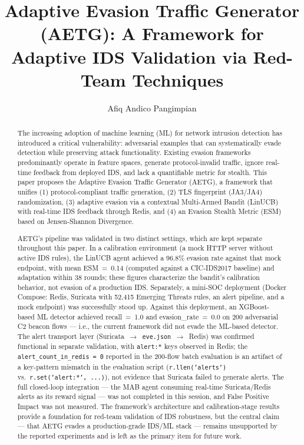 \documentclass[review]{elsarticle}
\begin{document}
\begin{frontmatter}

\title{Adaptive Evasion Traffic Generator (AETG): A Framework for Adaptive IDS Validation via Red-Team Techniques}

\author{Afiq Andico Pangimpian}

\address{Institut Teknologi dan Bisnis STIKOM Bali, Indonesia}

\begin{abstract}
The increasing adoption of machine learning (ML) for network intrusion detection has introduced a critical vulnerability: adversarial examples that can systematically evade detection while preserving attack functionality. Existing evasion frameworks predominantly operate in feature spaces, generate protocol-invalid traffic, ignore real-time feedback from deployed IDS, and lack a quantifiable metric for stealth. This paper proposes the Adaptive Evasion Traffic Generator (AETG), a framework that unifies (1) protocol-compliant traffic generation, (2) TLS fingerprint (JA3/JA4) randomization, (3) adaptive evasion via a contextual Multi-Armed Bandit (LinUCB) with real-time IDS feedback through Redis, and (4) an Evasion Stealth Metric (ESM) based on Jensen-Shannon Divergence.

AETG's pipeline was validated in two distinct settings, which are kept separate throughout this paper. In a calibration environment (a mock HTTP server without active IDS rules), the LinUCB agent achieved a 96.8\% evasion rate against that mock endpoint, with mean ESM~=~0.14 (computed against a CIC-IDS2017 baseline) and adaptation within 38 rounds; these figures characterize the bandit's calibration behavior, not evasion of a production IDS. Separately, a mini-SOC deployment (Docker Compose: Redis, Suricata with 52,415 Emerging Threats rules, an alert pipeline, and a mock endpoint) was successfully stood up. Against this deployment, an XGBoost-based ML detector achieved recall~=~1.0 and evasion\_rate~=~0.0 on 200 adversarial C2 beacon flows --- i.e., the current framework did not evade the ML-based detector. The alert transport layer (Suricata~$\rightarrow$~\texttt{eve.json}~$\rightarrow$~Redis) was confirmed functional in separate validation, with \texttt{alert:*} keys observed in Redis; the \texttt{alert\_count\_in\_redis~=~0} reported in the 200-flow batch evaluation is an artifact of a key-pattern mismatch in the evaluation script (\texttt{r.llen('alerts')} vs.\ \texttt{r.set('alert:*', ...)}), not evidence that Suricata failed to generate alerts. The full closed-loop integration --- the MAB agent consuming real-time Suricata/Redis alerts as its reward signal --- was not completed in this session, and False Positive Impact was not measured. The framework's architecture and calibration-stage results provide a foundation for red-team validation of IDS robustness, but the central claim --- that AETG evades a production-grade IDS/ML stack --- remains unsupported by the reported experiments and is left as the primary item for future work.
\end{abstract}


\end{frontmatter}
\end{document}
